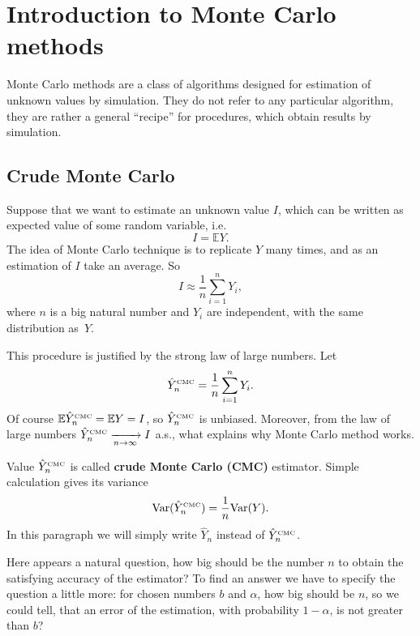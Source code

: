 \documentclass[a4paper,11pt, twoside]{book}
\theoremstyle{definition}
\theoremstyle{remark}
\def\Var{{\rm Var}}
\def\E{{\mathbb{E}}}
\def\conv{\xrightarrow[n \rightarrow \infty]{}}
\def\CMC[#1]{\hat{Y}^{\hbox{\tiny CMC}}_{#1}}
\begin{document}
\section{Introduction to Monte Carlo methods}
Monte Carlo methods are a class of algorithms designed for estimation of unknown values by simulation.
They do not refer to any particular algorithm, they are rather a general ``recipe'' for procedures, which obtain results by simulation.

\subsection{Crude Monte Carlo}
Suppose that we want to estimate an unknown value $I$, which can be written as expected value of some random variable, i.e.
\begin{equation}
 \label{eq:EY}
 I = \E Y. 
\end{equation}
The idea of Monte Carlo technique is to replicate $Y$ many times, and as an estimation of $I$ take an average. So
\[ I \approx \frac{1}{n} \sum\limits_{i=1}^n Y_i, \]
where $n$ is a big natural number and $Y_i$ are independent, with the same distribution as~$Y$.

This procedure is justified by the strong law of large numbers. Let 
\begin{equation}
 \label{eq:CMC}
 \CMC[n] = \frac{1}{n}\sum\limits_{i=1}^n Y_i.
\end{equation}
Of course $\E\CMC[n] = \E Y = I$, so $\CMC[n]$ is unbiased. Moreover, from the law of large numbers $\CMC[n] \conv I$ a.s., what explains why Monte Carlo method works. 

Value $\CMC[n]$ is called \textbf{crude Monte Carlo (CMC)} estimator. Simple calculation gives its variance
\begin{equation}
 \label{eq:VarCMC}
 \Var(\CMC[n]) = \frac{1}{n}\Var(Y).
\end{equation}
In this paragraph we will simply write $\hat{Y}_n$ instead of $\CMC[n]$.

Here appears a natural question, how big should be the number $n$ to obtain the satisfying accuracy of the estimator?
To find an answer we have to specify the question a little more: for chosen numbers $b$ and $\alpha$, how big should be $n$, so we could tell, that an error of the estimation, with probability $1-\alpha$, is not greater than $b$?
\end{document}
